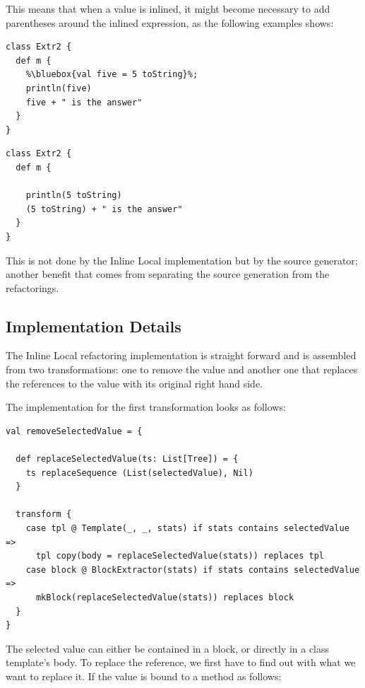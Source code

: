 \documentclass[10pt,a4paper,oneside]{scrreprt}
\begin{document}
This means that when a value is inlined, it might become necessary to add parentheses around the inlined expression, as the following examples shows:

\begin{multicols}{2}
\begin{lstlisting}
class Extr2 {
  def m {
    %\bluebox{val five = 5 toString}%;
    println(five)
    five + " is the answer"
  }
}
\end{lstlisting}
\begin{lstlisting}
class Extr2 {
  def m {

    println(5 toString)
    (5 toString) + " is the answer"
  }
}
\end{lstlisting}
\end{multicols}

This is not done by the Inline Local implementation but by the source generator; another benefit that comes from separating the source generation from the refactorings.

\subsection{Implementation Details}

The Inline Local refactoring implementation is straight forward and is assembled from two transformations: one to remove the value and another one that replaces the references to the value with its original right hand side.

The implementation for the first transformation looks as follows:

\begin{lstlisting}
val removeSelectedValue = {
      
  def replaceSelectedValue(ts: List[Tree]) = {
    ts replaceSequence (List(selectedValue), Nil)
  }
  
  transform {
    case tpl @ Template(_, _, stats) if stats contains selectedValue =>
      tpl copy(body = replaceSelectedValue(stats)) replaces tpl
    case block @ BlockExtractor(stats) if stats contains selectedValue =>
      mkBlock(replaceSelectedValue(stats)) replaces block
  }
}
\end{lstlisting}

The selected value can either be contained in a block, or directly in a class template's body. To replace the reference, we first have to find out with what we want to replace it. If the value is bound to a method as follows:
\end{document}
